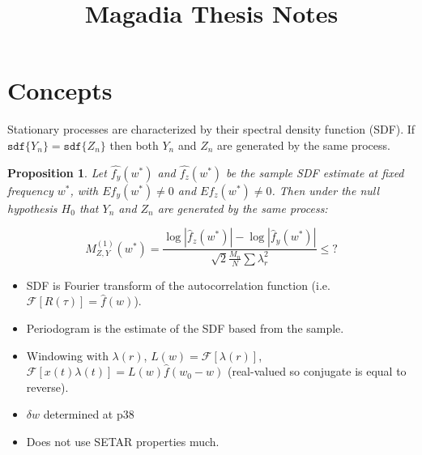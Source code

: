 \documentclass{article}
\title{Magadia Thesis Notes}
\newtheorem{proposition}{Proposition}
\newcommand{\Fourier}{\boldsymbol{\mathcal{F}}}
\begin{document}
\section{Concepts}
Stationary processes are characterized by their spectral density function
(SDF). If $\texttt{sdf}\{Y_{n}\} = \texttt{sdf}\{Z_{n}\}$ then both $Y_{n}$ and
$Z_{n}$ are generated by the same process.

\begin{proposition}
Let $\hat{f_{y}}(w^{*})$ and $\hat{f_{z}}(w^{*})$ be the sample SDF estimate at
fixed frequency $w^{*}$, with $E f_{y}(w^{*}) \neq 0$ and $E f_{z}(w^{*}) \neq
0$. Then under the null hypothesis $H_{0}$ that $Y_{n}$ and $Z_{n}$ are
generated by the same process: 

\[ M_{Z,Y}^{(1)}(w^{*}) = \frac{\log |\hat{f}_{z}(w^{*})| - \log
|\hat{f}_{y}(w^{*})|}{\sqrt{2} \frac{M_{n}}{N} \sum \lambda_{r}^{2}} \leq ? \]
\end{proposition}


\begin{itemize}
\item SDF is Fourier transform of the autocorrelation function
(i.e. $\Fourier [R(\tau)] = \hat{f}(w)$).
\item Periodogram is the estimate of the SDF based from the sample.
\item Windowing with $\lambda(r)$, $L(w) = \Fourier [\lambda(r)]$, $\Fourier
[x(t) \lambda(t)] = L(w) \hat{f}(w_{0} - w)$ (real-valued so conjugate is equal
to reverse).
\item $\delta w$ determined at p38
\item Does not use SETAR properties much.
\end{itemize}
\end{document}
